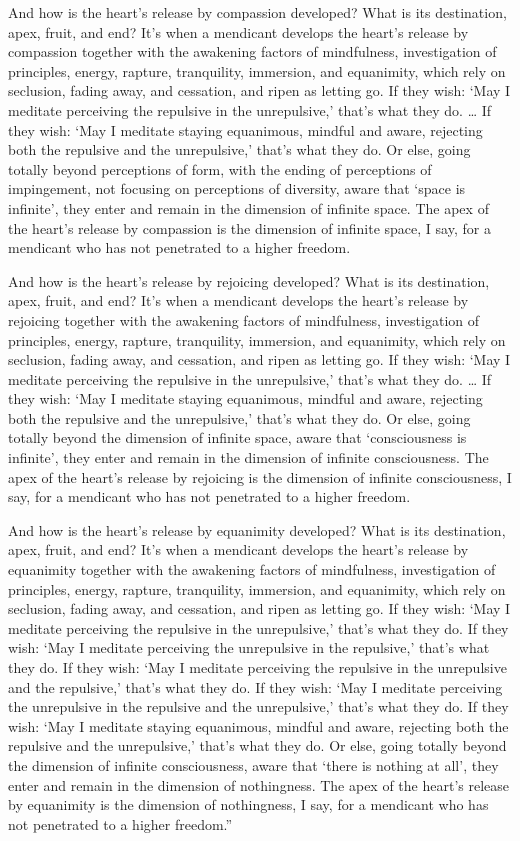 \documentclass[12pt,openany]{book}%
\begin{document}
And how is the heart’s release by compassion developed? What is its destination, apex, fruit, and end? It’s when a mendicant develops the heart’s release by compassion together with the awakening factors of mindfulness, investigation of principles, energy, rapture, tranquility, immersion, and equanimity, which rely on seclusion, fading away, and cessation, and ripen as letting go. If they wish: ‘May I meditate perceiving the repulsive in the unrepulsive,’ that’s what they do. … If they wish: ‘May I meditate staying equanimous, mindful and aware, rejecting both the repulsive and the unrepulsive,’ that’s what they do. Or else, going totally beyond perceptions of form, with the ending of perceptions of impingement, not focusing on perceptions of diversity, aware that ‘space is infinite’, they enter and remain in the dimension of infinite space. The apex of the heart’s release by compassion is the dimension of infinite space, I say, for a mendicant who has not penetrated to a higher freedom. 

And how is the heart’s release by rejoicing developed? What is its destination, apex, fruit, and end? It’s when a mendicant develops the heart’s release by rejoicing together with the awakening factors of mindfulness, investigation of principles, energy, rapture, tranquility, immersion, and equanimity, which rely on seclusion, fading away, and cessation, and ripen as letting go. If they wish: ‘May I meditate perceiving the repulsive in the unrepulsive,’ that’s what they do. … If they wish: ‘May I meditate staying equanimous, mindful and aware, rejecting both the repulsive and the unrepulsive,’ that’s what they do. Or else, going totally beyond the dimension of infinite space, aware that ‘consciousness is infinite’, they enter and remain in the dimension of infinite consciousness. The apex of the heart’s release by rejoicing is the dimension of infinite consciousness, I say, for a mendicant who has not penetrated to a higher freedom. 

And how is the heart’s release by equanimity developed? What is its destination, apex, fruit, and end? It’s when a mendicant develops the heart’s release by equanimity together with the awakening factors of mindfulness, investigation of principles, energy, rapture, tranquility, immersion, and equanimity, which rely on seclusion, fading away, and cessation, and ripen as letting go. If they wish: ‘May I meditate perceiving the repulsive in the unrepulsive,’ that’s what they do. If they wish: ‘May I meditate perceiving the unrepulsive in the repulsive,’ that’s what they do. If they wish: ‘May I meditate perceiving the repulsive in the unrepulsive and the repulsive,’ that’s what they do. If they wish: ‘May I meditate perceiving the unrepulsive in the repulsive and the unrepulsive,’ that’s what they do. If they wish: ‘May I meditate staying equanimous, mindful and aware, rejecting both the repulsive and the unrepulsive,’ that’s what they do. Or else, going totally beyond the dimension of infinite consciousness, aware that ‘there is nothing at all’, they enter and remain in the dimension of nothingness. The apex of the heart’s release by equanimity is the dimension of nothingness, I say, for a mendicant who has not penetrated to a higher freedom.” 
\end{document}

